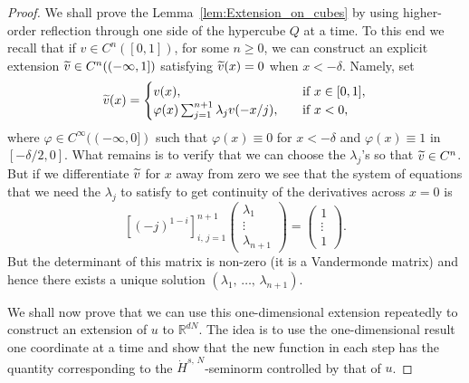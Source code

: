 \documentclass[10pt]{amsart}
\theoremstyle{definition}\newtheorem{defi}[theo]{Definition}\newtheorem{rema}[theo]{Remark}\newtheorem{exam}[theo]{Example}\newtheorem{exem}[theo]{Example}\newtheorem{nota}[theo]{Notation}
\newcommand*\R {\mathbb{R}}
\newcommand\1{{\ensuremath {\mathds 1} }}
\let\oldtilde\tilde
\renewcommand*{\tilde}[1]{\mathchoice{\widetilde{#1}}{\widetilde{#1}}{\oldtilde{#1}}{\oldtilde{#1}}}\let\oldhat\hat
\renewcommand*{\hat}[1]{\mathchoice{\widehat{#1}}{\widehat{#1}}{\oldhat{#1}}{\oldhat{#1}}}\let\oldforall\forall
\renewcommand*{\forall}{\mathrel{\oldforall}}
\begin{document}
\begin{proof}
We shall prove the Lemma~\ref{lem:Extension_on_cubes} by using higher-order reflection through one side of the hypercube $Q$ at a time. To this end we recall that if $v\in C^n([0, 1])$, for some $n\geq 0$, we can construct an explicit extension $\tilde v\in C^n((-\infty, 1])$ satisfying $\tilde v(x)=0$ when $x<-\delta$. Namely, set
\begin{equation*}
\tilde v(x)=
\begin{cases}
v(x), \quad &\text{if } x\in [0, 1],\\
\varphi(x)\sum_{j=1}^{n+1} \lambda_j v(-x/j), \quad &\text{if } x<0,
\end{cases}
\end{equation*}
where $\varphi \in C^\infty((-\infty, 0])$ such that $\varphi(x)\equiv 0$ for $x<-\delta$ and $\varphi(x)\equiv 1$ in $[-\delta/2, 0]$. What remains is to verify that we can choose the $\lambda_j$'s so that $\tilde v\in C^n$. But if we differentiate $\tilde v$ for $x$ away from zero we see that the system of equations that we need the $\lambda_j$ to satisfy to get continuity of the derivatives across $x=0$ is
\begin{equation*}
\left[(-j)^{1-i}\right]_{i,\,j=1}^{n+1}\left(
\begin{matrix}
\lambda_1 \\ \vdots \\ \lambda_{n+1}
\end{matrix}\right) =\left(
\begin{matrix}
1\\ \vdots \\ 1
\end{matrix}\right).
\end{equation*}
But the determinant of this matrix is non-zero (it is a Vandermonde matrix) and hence there exists a unique solution $(\lambda_1,\,\ldots,\,\lambda_{n+1})$.

We shall now prove that we can use this one-dimensional extension repeatedly to construct an extension of $u$ to $\R^{dN}$. The idea is to use the one-dimensional result one coordinate at a time and show that the new function in each step has the quantity corresponding to the $\dot{H}^{s,\,N}$-seminorm controlled by that of $u$.


\end{proof}
\end{document}

